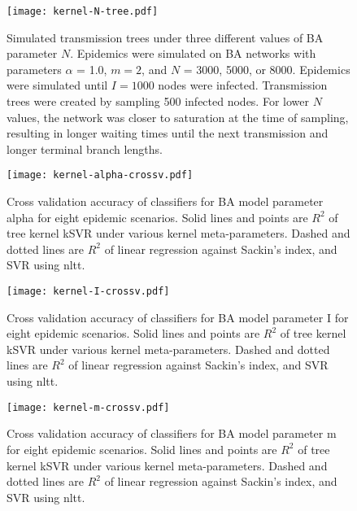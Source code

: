 \begin{figure}[ht]
  \centering
  \texttt{[image: kernel-N-tree.pdf]}
  \caption[Simulated transmission trees under three different values of BA parameter $N$]{
    Simulated transmission trees under three different values of BA parameter
    $N$. Epidemics were simulated on \gls{BA} networks with parameters $\alpha$
    = 1.0, $m = 2$, and $N$ = 3000, 5000, or 8000. Epidemics were simulated
    until $I = 1000$ nodes were infected. Transmission trees were created by
    sampling 500 infected nodes. For lower $N$ values, the network was closer
    to saturation at the time of sampling, resulting in longer waiting times
    until the next transmission and longer terminal branch lengths.
  }
  \label{fig:Ntrees}
\end{figure}

\begin{figure}[ht]
  \centering
  \texttt{[image: kernel-alpha-crossv.pdf]}
  \caption[Cross validation accuracy of classifiers for \gls{BA} model parameter
    \gls{alpha} for eight epidemic scenarios.]
  {
    Cross validation accuracy of classifiers for \gls{BA} model parameter
    \gls{alpha} for eight epidemic scenarios. Solid lines and points are
    $R^2$ of tree kernel \gls{kSVR} under various kernel meta-parameters.
    Dashed and dotted lines are $R^2$ of linear regression against Sackin's
    index, and \gls{SVR} using \gls{nltt}.
  }
  \label{fig:alphacrossv}
\end{figure}

\begin{figure}[ht]
  \centering
  \texttt{[image: kernel-I-crossv.pdf]}
  \caption[Cross validation accuracy of classifiers for \gls{BA} model parameter
    \gls{I} for eight epidemic scenarios.]
  {
    Cross validation accuracy of classifiers for \gls{BA} model parameter
    \gls{I} for eight epidemic scenarios. Solid lines and points are $R^2$ of
    tree kernel \gls{kSVR} under various kernel meta-parameters. Dashed and
    dotted lines are $R^2$ of linear regression against Sackin's index, and
    \gls{SVR} using \gls{nltt}.
  }
  \label{fig:Icrossv}
\end{figure}

\begin{figure}[ht]
  \centering
  \texttt{[image: kernel-m-crossv.pdf]}
  \caption[Cross validation accuracy of classifiers for \gls{BA} model parameter
    \gls{m} for eight epidemic scenarios.]
  {
    Cross validation accuracy of classifiers for \gls{BA} model parameter
    \gls{m} for eight epidemic scenarios. Solid lines and points are $R^2$ of
    tree kernel \gls{kSVR} under various kernel meta-parameters. Dashed and
    dotted lines are $R^2$ of linear regression against Sackin's index, and
    \gls{SVR} using \gls{nltt}.
  }
  \label{fig:mcrossv}
\end{figure}

